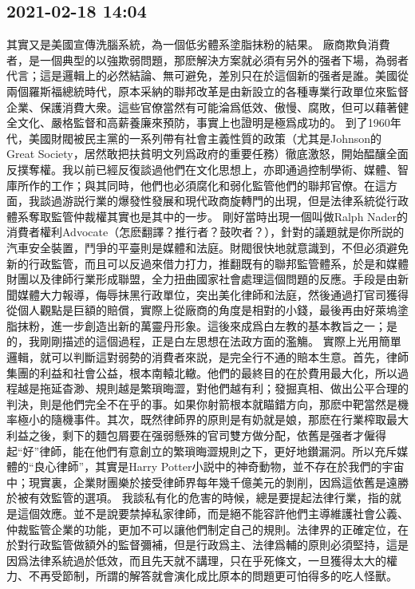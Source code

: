 \documentclass[twocolumn]{ctexart}
\begin{document}
\subsection*{2021-02-18 14:04}

其實又是美國宣傳洗腦系統，為一個低劣體系塗脂抹粉的結果。
廠商欺負消費者，是一個典型的以強欺弱問題，那麽解決方案就必須有另外的强者下場，為弱者代言；這是邏輯上的必然結論、無可避免，差別只在於這個新的强者是誰。美國從兩個羅斯福總統時代，原本采納的聯邦改革是由新設立的各種專業行政單位來監督企業、保護消費大衆。這些官僚當然有可能淪爲低效、傲慢、腐敗，但可以藉著健全文化、嚴格監督和高薪養廉來預防，事實上也證明是極爲成功的。
到了1960年代，美國財閥被民主黨的一系列帶有社會主義性質的政策（尤其是Johnson的Great Society，居然敢把扶貧明文列爲政府的重要任務）徹底激怒，開始醖釀全面反撲奪權。我以前已經反復談過他們在文化思想上，亦即通過控制學術、媒體、智庫所作的工作；與其同時，他們也必須腐化和弱化監管他們的聯邦官僚。在這方面，我談過游説行業的爆發性發展和現代政商旋轉門的出現，但是法律系統從行政體系奪取監管仲裁權其實也是其中的一步。
剛好當時出現一個叫做Ralph Nader的消費者權利Advocate（怎麽翻譯？推行者？鼓吹者？），針對的議題就是你所説的汽車安全裝置，鬥爭的平臺則是媒體和法庭。財閥很快地就意識到，不但必須避免新的行政監管，而且可以反過來借力打力，推翻既有的聯邦監管體系，於是和媒體財團以及律師行業形成聯盟，全力扭曲國家社會處理這個問題的反應。手段是由新聞媒體大力報導，侮辱抹黑行政單位，突出美化律師和法庭，然後通過打官司獲得從個人觀點是巨額的賠償，實際上從廠商的角度是相對的小錢，最後再由好萊塢塗脂抹粉，進一步創造出新的萬靈丹形象。這後來成爲白左教的基本教旨之一；是的，我剛剛描述的這個過程，正是白左思想在法政方面的濫觴。
實際上光用簡單邏輯，就可以判斷這對弱勢的消費者來説，是完全行不通的賠本生意。首先，律師集團的利益和社會公益，根本南轅北轍。他們的最終目的在於費用最大化，所以過程越是拖延杳渺、規則越是繁瑣晦澀，對他們越有利；發掘真相、做出公平合理的判決，則是他們完全不在乎的事。如果你射箭根本就瞄錯方向，那麽中靶當然是機率極小的隨機事件。其次，既然律師界的原則是有奶就是娘，那麽在行業榨取最大利益之後，剩下的麵包屑要在强弱懸殊的官司雙方做分配，依舊是强者才僱得起“好”律師，能在他們有意創立的繁瑣晦澀規則之下，更好地鑚漏洞。所以充斥媒體的“良心律師”，其實是Harry Potter小説中的神奇動物，並不存在於我們的宇宙中；現實裏，企業財團樂於接受律師界每年幾千億美元的剝削，因爲這依舊是遠勝於被有效監管的選項。
我談私有化的危害的時候，總是要提起法律行業，指的就是這個效應。並不是說要禁掉私家律師，而是絕不能容許他們主導維護社會公義、仲裁監管企業的功能，更加不可以讓他們制定自己的規則。法律界的正確定位，在於對行政監管做額外的監督彌補，但是行政爲主、法律爲輔的原則必須堅持，這是因爲法律系統過於低效，而且先天就不講理，只在乎死條文，一旦獲得太大的權力、不再受節制，所謂的解答就會演化成比原本的問題更可怕得多的吃人怪獸。
\end{document}
